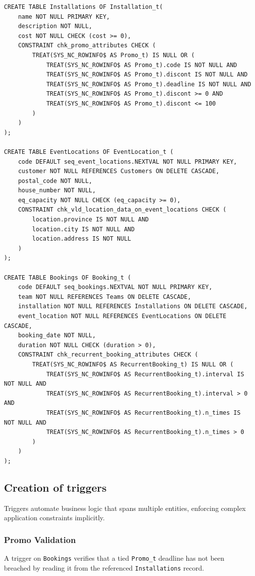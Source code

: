 \begin{verbatim}
CREATE TABLE Installations OF Installation_t(
    name NOT NULL PRIMARY KEY,
    description NOT NULL,
    cost NOT NULL CHECK (cost >= 0),
    CONSTRAINT chk_promo_attributes CHECK (
        TREAT(SYS_NC_ROWINFO$ AS Promo_t) IS NULL OR (
            TREAT(SYS_NC_ROWINFO$ AS Promo_t).code IS NOT NULL AND
            TREAT(SYS_NC_ROWINFO$ AS Promo_t).discont IS NOT NULL AND
            TREAT(SYS_NC_ROWINFO$ AS Promo_t).deadline IS NOT NULL AND
            TREAT(SYS_NC_ROWINFO$ AS Promo_t).discont >= 0 AND
            TREAT(SYS_NC_ROWINFO$ AS Promo_t).discont <= 100
        )
    )
);

CREATE TABLE EventLocations OF EventLocation_t (
    code DEFAULT seq_event_locations.NEXTVAL NOT NULL PRIMARY KEY,
    customer NOT NULL REFERENCES Customers ON DELETE CASCADE,
    postal_code NOT NULL,
    house_number NOT NULL,
    eq_capacity NOT NULL CHECK (eq_capacity >= 0),
    CONSTRAINT chk_vld_location_data_on_event_locations CHECK (
        location.province IS NOT NULL AND
        location.city IS NOT NULL AND
        location.address IS NOT NULL
    )
);

CREATE TABLE Bookings OF Booking_t (
    code DEFAULT seq_bookings.NEXTVAL NOT NULL PRIMARY KEY,
    team NOT NULL REFERENCES Teams ON DELETE CASCADE,
    installation NOT NULL REFERENCES Installations ON DELETE CASCADE, 
    event_location NOT NULL REFERENCES EventLocations ON DELETE CASCADE,
    booking_date NOT NULL,
    duration NOT NULL CHECK (duration > 0),
    CONSTRAINT chk_recurrent_booking_attributes CHECK (
        TREAT(SYS_NC_ROWINFO$ AS RecurrentBooking_t) IS NULL OR (
            TREAT(SYS_NC_ROWINFO$ AS RecurrentBooking_t).interval IS NOT NULL AND
            TREAT(SYS_NC_ROWINFO$ AS RecurrentBooking_t).interval > 0 AND
            TREAT(SYS_NC_ROWINFO$ AS RecurrentBooking_t).n_times IS NOT NULL AND
            TREAT(SYS_NC_ROWINFO$ AS RecurrentBooking_t).n_times > 0
        )
    )
);
\end{verbatim}

\subsection{Creation of triggers}

Triggers automate business logic that spans multiple entities, enforcing complex application constraints implicitly.

\subsubsection{Promo Validation}
A trigger on \texttt{Bookings} verifies that a tied \texttt{Promo\_t} deadline has not been breached by reading it from the referenced \texttt{Installations} record.

